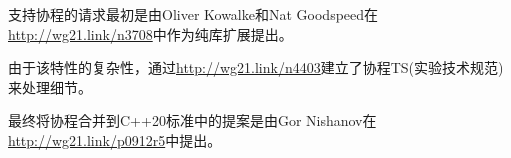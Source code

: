 支持协程的请求最初是由Oliver Kowalke和Nat Goodspeed在\url{http://wg21.link/n3708}中作为纯库扩展提出。

由于该特性的复杂性，通过\url{http://wg21.link/n4403}建立了协程TS(实验技术规范)来处理细节。

最终将协程合并到C++20标准中的提案是由Gor Nishanov在\url{http://wg21.link/p0912r5}中提出。